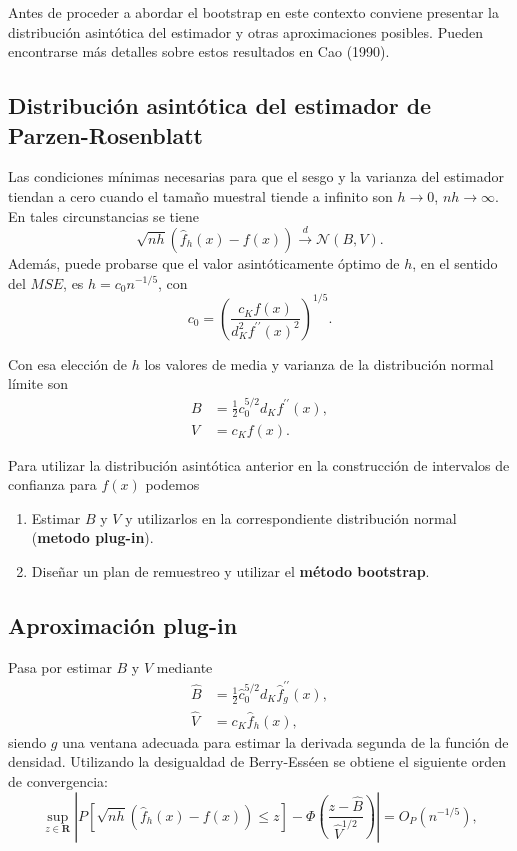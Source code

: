 \documentclass[]{book}
\theoremstyle{definition}
\theoremstyle{definition}
\theoremstyle{definition}
\theoremstyle{remark}
\begin{document}
Antes de proceder a abordar el bootstrap en este contexto conviene
presentar la distribución asintótica del estimador y otras
aproximaciones posibles. Pueden encontrarse más detalles sobre estos
resultados en Cao (1990).

\subsection{Distribución asintótica del estimador de
Parzen-Rosenblatt}\label{distribucion-asintotica-del-estimador-de-parzen-rosenblatt}

Las condiciones mínimas necesarias para que el sesgo y la varianza del
estimador tiendan a cero cuando el tamaño muestral tiende a infinito son
\(h\rightarrow 0\), \(nh\rightarrow \infty\). En tales circunstancias se
tiene
\[\sqrt{nh}\left( \hat{f}_{h}\left( x \right) -f\left( x \right) \right) \overset
{d}{\rightarrow }\mathcal{N}\left( B,V \right) \text{.}\]Además, puede
probarse que el valor asintóticamente óptimo de \(h\), en el sentido del
\(MSE\), es \(h=c_{0}n^{-1/5}\), con
\[c_{0}=\left( \frac{c_{K}f\left( x \right)}{d_{K}^2f^{\prime \prime }\left(
x \right)^2} \right)^{1/5}.\]

Con esa elección de \(h\) los valores de media y varianza de la
distribución normal límite son\[\begin{aligned}
B &= \frac{1}{2}c_{0}^{5/2}d_{K}f^{\prime \prime }\left( x \right), \\
V &= c_{K}f\left( x \right).\end{aligned}\]

Para utilizar la distribución asintótica anterior en la construcción de
intervalos de confianza para \(f\left( x \right)\) podemos

\begin{enumerate}
\def\labelenumi{\arabic{enumi}.}
\item
  Estimar \(B\) y \(V\) y utilizarlos en la correspondiente distribución
  normal (\textbf{metodo plug-in}).
\item
  Diseñar un plan de remuestreo y utilizar el \textbf{método bootstrap}.
\end{enumerate}

\subsection{Aproximación plug-in}\label{aproximacion-plug-in}

Pasa por estimar \(B\) y \(V\) mediante\[\begin{aligned}
\hat{B} &= \frac{1}{2}\hat{c}_{0}^{5/2}d_{K}\hat{f}_{g}^{\prime \prime
}\left( x \right), \\
\hat{V} &= c_{K}\hat{f}_{h}\left( x \right),\end{aligned}\]siendo \(g\)
una ventana adecuada para estimar la derivada segunda de la función de
densidad. Utilizando la desigualdad de Berry-Esséen se obtiene el
siguiente orden de
convergencia:\[\sup_{z\in \boldsymbol{R}}\left\vert P\left[ \sqrt{nh}\left( \hat{f}
_{h}\left( x \right) -f\left( x \right) \right) \leq z\right] -\Phi \left( 
\frac{z-\hat{B}}{\hat{V}^{1/2}} \right) \right\vert =O_{P}\left(
n^{-1/5} \right),\]
\end{document}
